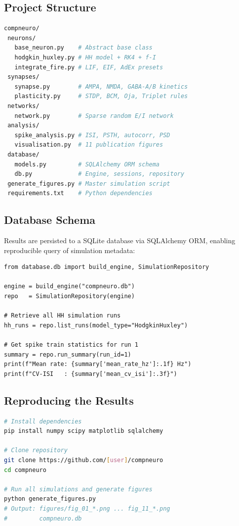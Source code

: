 \documentclass[11pt, a4paper, twocolumn]{article}
\begin{document}
\subsection{Project Structure}

\begin{lstlisting}[caption={Project directory structure.},
                   language=bash, basicstyle=\ttfamily\scriptsize]
compneuro/
 neurons/
   base_neuron.py    # Abstract base class
   hodgkin_huxley.py # HH model + RK4 + f-I
   integrate_fire.py # LIF, EIF, AdEx presets
 synapses/
   synapse.py        # AMPA, NMDA, GABA-A/B kinetics
   plasticity.py     # STDP, BCM, Oja, Triplet rules
 networks/
   network.py        # Sparse random E/I network
 analysis/
   spike_analysis.py # ISI, PSTH, autocorr, PSD
   visualisation.py  # 11 publication figures
 database/
   models.py         # SQLAlchemy ORM schema
   db.py             # Engine, sessions, repository
 generate_figures.py # Master simulation script
 requirements.txt    # Python dependencies
\end{lstlisting}

\subsection{Database Schema}

Results are persisted to a SQLite database via SQLAlchemy ORM, enabling
reproducible query of simulation metadata:

\begin{lstlisting}[caption={Querying simulation results via SQLAlchemy.}]
from database.db import build_engine, SimulationRepository

engine = build_engine("compneuro.db")
repo   = SimulationRepository(engine)

# Retrieve all HH simulation runs
hh_runs = repo.list_runs(model_type="HodgkinHuxley")

# Get spike train statistics for run 1
summary = repo.run_summary(run_id=1)
print(f"Mean rate: {summary['mean_rate_hz']:.1f} Hz")
print(f"CV-ISI   : {summary['mean_cv_isi']:.3f}")
\end{lstlisting}

\subsection{Reproducing the Results}

\begin{lstlisting}[caption={Running the simulation suite.}, language=bash]
# Install dependencies
pip install numpy scipy matplotlib sqlalchemy

# Clone repository
git clone https://github.com/[user]/compneuro
cd compneuro

# Run all simulations and generate figures
python generate_figures.py
# Output: figures/fig_01_*.png ... fig_11_*.png
#         compneuro.db
\end{lstlisting}
\end{document}
